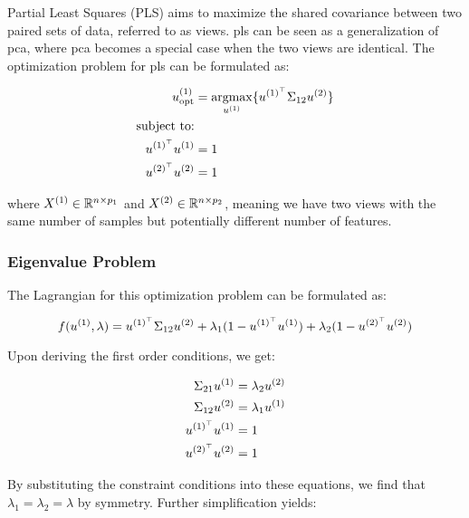 Partial Least Squares (PLS)\citep{wold1975path} aims to maximize the shared covariance between two paired sets of data, referred to as \gls{views}. \acrshort{pls} can be seen as a generalization of \acrshort{pca}, where \acrshort{pca} becomes a special case when the two \gls{views} are identical. The optimization problem for \acrshort{pls} can be formulated as:

\begin{align}
    u^{(1)}_{\text{opt}} & = \underset{u^{(1)}}{\mathrm{argmax}} \{ u^{(1)^{\top}} \Sigma_{12} u^{(2)} \} \\
    \text{subject to:} \notag                                                                             \\
    u^{(1)^{\top}}u^{(1)}   & = 1 \notag                                                                    \\
    u^{(2)^{\top}}u^{(2)}   & = 1 \notag
\end{align}

where \( X^{(1)} \in \mathbb{R}^{n \times p_1} \) and \( X^{(2)} \in \mathbb{R}^{n \times p_2} \), meaning we have two \gls{views} with the same number of samples but potentially different number of features.

\subsubsection{Eigenvalue Problem}

The Lagrangian for this optimization problem can be formulated as:

\begin{equation}
    f(u^{(1)}, \lambda) = u^{(1)^{\top}} \Sigma_{12} u^{(2)} + \lambda_1 (1 - u^{(1)^{\top}}u^{(1)}) + \lambda_2 (1 - u^{(2)^{\top}}u^{(2)})
\end{equation}

Upon deriving the first order conditions, we get:

\begin{align}
    \Sigma_{21} u^{(1)} & = \lambda_2 u^{(2)} \\
    \Sigma_{12} u^{(2)} & = \lambda_1 u^{(1)} \\
    u^{(1)^{\top}}u^{(1)}  & = 1                  \\
    u^{(2)^{\top}}u^{(2)}  & = 1
\end{align}

By substituting the constraint conditions into these equations, we find that \( \lambda_1 = \lambda_2 = \lambda \) by symmetry. Further simplification yields:

